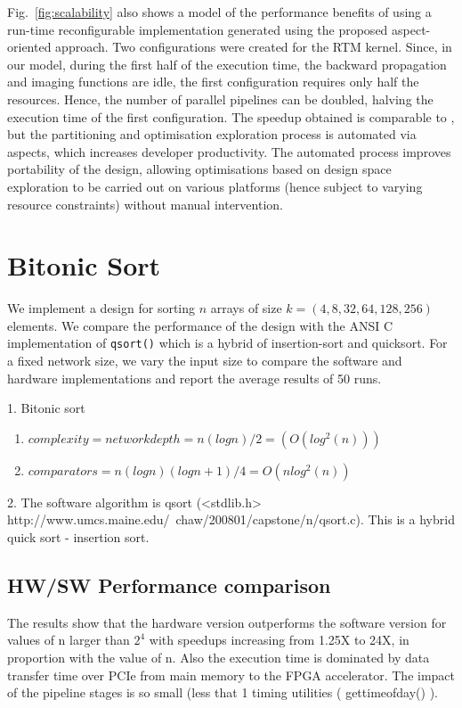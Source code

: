 Fig.~\ref{fig:scalability} also shows a model of the performance
benefits of using a run-time reconfigurable implementation generated
using the proposed aspect-oriented approach. Two configurations were
created for the RTM \FAST{} kernel. Since, in our model, during the
first half of the execution time, the backward propagation and imaging
functions are idle, the first configuration requires only half the
resources. Hence, the number of parallel pipelines can be doubled,
halving the execution time of the first configuration. The speedup
obtained is comparable to \cite{Xinyu:Qiwei:Luk:Qiang:Pell:2012}, but
the partitioning and optimisation exploration process is automated via
aspects, which increases developer productivity. The automated process
improves portability of the design, allowing optimisations based on
design space exploration to be carried out on various platforms (hence
subject to varying resource constraints) without manual intervention.


\section{Bitonic Sort}

We implement a design for sorting $n$ arrays of size $k = (4, 8, 32,
64, 128, 256)$ elements. We compare the performance of the design with
the ANSI C implementation of \texttt{qsort()} which is a hybrid of
insertion-sort and quicksort. For a fixed network size, we vary the
input size to compare the software and hardware implementations and
report the average results of 50 runs.



1. Bitonic sort
\begin{enumerate}
\item $complexity = network depth = n(logn)/2 =  (O(log^2(n)))  $
\item $ comparators = n (logn) (logn + 1) / 4 = O(nlog^2(n)) $
\end{enumerate}


2. The software algorithm is qsort (<stdlib.h>
http://www.umcs.maine.edu/~chaw/200801/capstone/n/qsort.c). This is a
hybrid quick sort - insertion sort.


\subsection{HW/SW Performance comparison}

The results show that the hardware version outperforms the software
version for values of n larger than $2^4$ with speedups increasing from
1.25X to 24X, in proportion with the value of n.  Also the execution
time is dominated by data transfer time over PCIe from main memory to
the FPGA accelerator. The impact of the pipeline stages is so small
(less that 1%
timing utilities ( gettimeofday() ).

